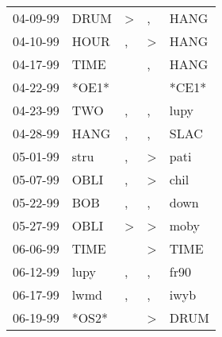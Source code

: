 \begin{supertabular}{p{0.07\textwidth}p{0.06\textwidth}p{0.02\textwidth}p{0.02\textwidth}p{0.06\textwidth}}
          04-09-99\textsuperscript{} &           DRUM\textsuperscript{} &     \textgreater &                , &           HANG\textsuperscript{} \\
          04-10-99\textsuperscript{} &           HOUR\textsuperscript{} &                , &     \textgreater &           HANG\textsuperscript{} \\
          04-17-99\textsuperscript{} &           TIME\textsuperscript{} &                  &                , &           HANG\textsuperscript{} \\
          04-22-99\textsuperscript{} &                            *OE1* &                  &                  &                            *CE1* \\
          04-23-99\textsuperscript{} &            TWO\textsuperscript{} &                , &                , &           lupy\textsuperscript{} \\
          04-28-99\textsuperscript{} &           HANG\textsuperscript{} &                , &                , &           SLAC\textsuperscript{} \\
          05-01-99\textsuperscript{} &           stru\textsuperscript{} &                , &     \textgreater &           pati\textsuperscript{} \\
          05-07-99\textsuperscript{} &           OBLI\textsuperscript{} &                , &     \textgreater &           chil\textsuperscript{} \\
          05-22-99\textsuperscript{} &            BOB\textsuperscript{} &                , &                , &           down\textsuperscript{} \\
          05-27-99\textsuperscript{} &           OBLI\textsuperscript{} &     \textgreater &     \textgreater &           moby\textsuperscript{} \\
          06-06-99\textsuperscript{} &           TIME\textsuperscript{} &                  &     \textgreater &           TIME\textsuperscript{} \\
          06-12-99\textsuperscript{} &           lupy\textsuperscript{} &                , &                , &           fr90\textsuperscript{} \\
          06-17-99\textsuperscript{} &           lwmd\textsuperscript{} &                , &                , &           iwyb\textsuperscript{} \\
          06-19-99\textsuperscript{} &                            *OS2* &                  &     \textgreater &           DRUM\textsuperscript{} \\

\end{supertabular}
